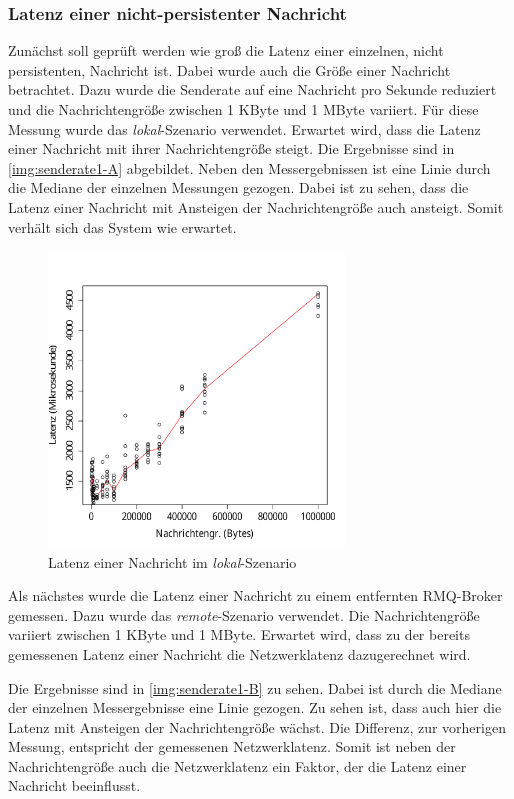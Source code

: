 \subsubsection{Latenz einer nicht-persistenter Nachricht}
\label{sec:oneMsgLatency}
Zunächst soll geprüft werden wie groß die Latenz einer einzelnen, nicht persistenten, Nachricht ist. Dabei wurde auch die Größe einer Nachricht betrachtet. Dazu wurde die Senderate auf eine Nachricht pro Sekunde reduziert und die Nachrichtengröße zwischen 1 KByte und 1 MByte variiert. Für diese Messung wurde das \textit{lokal}-Szenario verwendet. Erwartet wird, dass die Latenz einer Nachricht mit ihrer Nachrichtengröße steigt.
Die Ergebnisse sind in \autoref{img:senderate1-A} abgebildet. Neben den Messergebnissen ist eine Linie durch die Mediane der einzelnen Messungen gezogen. Dabei ist zu sehen, dass die Latenz einer Nachricht mit Ansteigen der Nachrichtengröße auch ansteigt. Somit verhält sich das System wie erwartet.
\begin{figure}
\center
  \includegraphics[width=0.7\textwidth]{images/measurement/rate-limit-1-A.pdf}
  \caption{Latenz einer Nachricht im \textit{lokal}-Szenario}
  \label{img:senderate1-A}
\end{figure}

Als nächstes wurde die Latenz einer Nachricht zu einem entfernten RMQ-Broker gemessen. Dazu wurde das \textit{remote}-Szenario verwendet. Die Nachrichtengröße variiert zwischen 1 KByte und 1 MByte. Erwartet wird, dass zu der bereits gemessenen Latenz einer Nachricht die Netzwerklatenz dazugerechnet wird.

Die Ergebnisse sind in \autoref{img:senderate1-B} zu sehen. Dabei ist durch die Mediane der einzelnen Messergebnisse eine Linie gezogen. Zu sehen ist, dass auch hier die Latenz mit Ansteigen der Nachrichtengröße wächst. Die Differenz, zur vorherigen Messung, entspricht der gemessenen Netzwerklatenz.
Somit ist neben der Nachrichtengröße auch die Netzwerklatenz ein Faktor, der die Latenz einer Nachricht beeinflusst.

